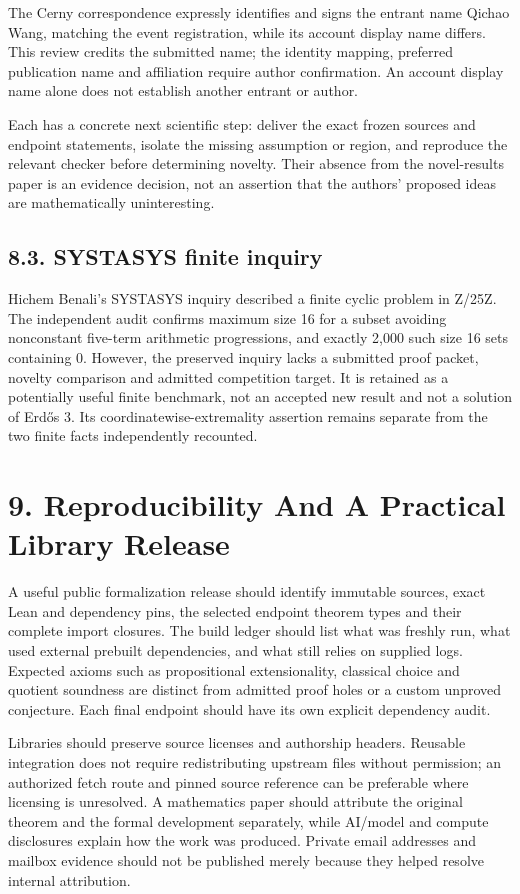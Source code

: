 \documentclass[11pt,a4paper]{article}
\begin{document}
The Cerny correspondence expressly identifies and signs the entrant name Qichao Wang, matching the event registration, while its account display name differs. This review credits the submitted name; the identity mapping, preferred publication name and affiliation require author confirmation. An account display name alone does not establish another entrant or author.

Each has a concrete next scientific step: deliver the exact frozen sources and endpoint statements, isolate the missing assumption or region, and reproduce the relevant checker before determining novelty. Their absence from the novel-results paper is an evidence decision, not an assertion that the authors' proposed ideas are mathematically uninteresting.

\subsection{8.3. SYSTASYS finite inquiry}
Hichem Benali's SYSTASYS inquiry described a finite cyclic problem in Z/25Z. The independent audit confirms maximum size 16 for a subset avoiding nonconstant five-term arithmetic progressions, and exactly 2,000 such size 16 sets containing 0. However, the preserved inquiry lacks a submitted proof packet, novelty comparison and admitted competition target. It is retained as a potentially useful finite benchmark, not an accepted new result and not a solution of Erdős 3. Its coordinatewise-extremality assertion remains separate from the two finite facts independently recounted.

\section{9. Reproducibility And A Practical Library Release}
A useful public formalization release should identify immutable sources, exact Lean and dependency pins, the selected endpoint theorem types and their complete import closures. The build ledger should list what was freshly run, what used external prebuilt dependencies, and what still relies on supplied logs. Expected axioms such as propositional extensionality, classical choice and quotient soundness are distinct from admitted proof holes or a custom unproved conjecture. Each final endpoint should have its own explicit dependency audit.

Libraries should preserve source licenses and authorship headers. Reusable integration does not require redistributing upstream files without permission; an authorized fetch route and pinned source reference can be preferable where licensing is unresolved. A mathematics paper should attribute the original theorem and the formal development separately, while AI/model and compute disclosures explain how the work was produced. Private email addresses and mailbox evidence should not be published merely because they helped resolve internal attribution.
\end{document}
